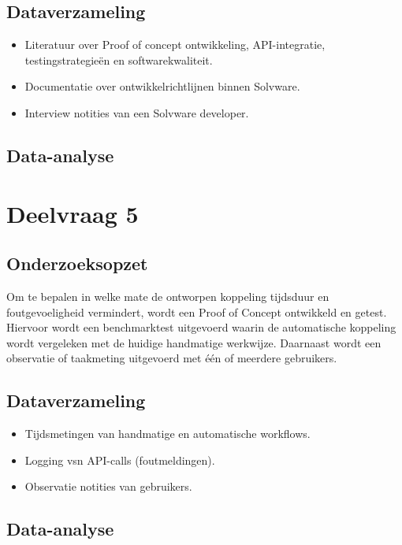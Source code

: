 \subsection{Dataverzameling}
\begin{itemize}
    \item Literatuur over Proof of concept ontwikkeling, API-integratie, testingstrategieën en softwarekwaliteit.
    \item Documentatie over ontwikkelrichtlijnen binnen Solvware.
    \item Interview notities van een Solvware developer.
\end{itemize}

\subsection{Data-analyse}


\section{Deelvraag 5}

\subsection{Onderzoeksopzet}
Om te bepalen in welke mate de ontworpen koppeling tijdsduur en foutgevoeligheid vermindert, wordt een Proof of Concept ontwikkeld en getest.
Hiervoor wordt een benchmarktest uitgevoerd waarin de automatische koppeling wordt vergeleken met de huidige handmatige werkwijze.
Daarnaast wordt een observatie of taakmeting uitgevoerd met één of meerdere gebruikers.

\subsection{Dataverzameling}
\begin{itemize}
    \item Tijdsmetingen van handmatige en automatische workflows.
    \item Logging vsn API-calls (foutmeldingen).
    \item Observatie notities van gebruikers.
\end{itemize}

\subsection{Data-analyse}
